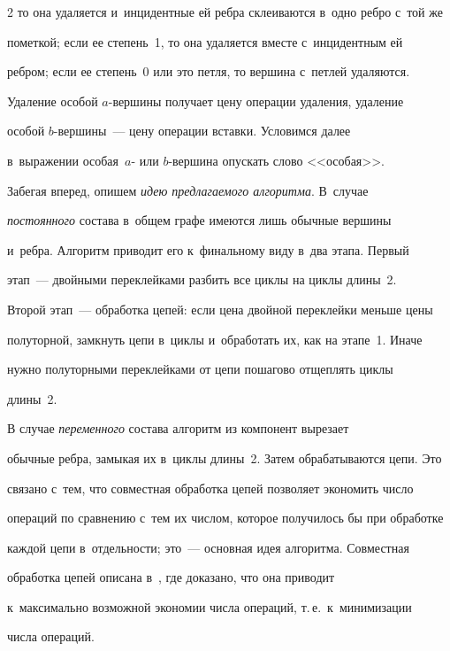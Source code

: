 \begin{multicols}{2}
то она удаляется и~инцидентные ей реб\-ра склеиваются в~одно реб\-ро с~той же 


пометкой; если ее степень~1, то она удаляется вместе с~инцидентным ей 


ребром; если ее степень~0 или это пет\-ля, то вершина с~пет\-лей удаляются. 


Удаление особой $a$-вер\-ши\-ны получает цену операции удаления, удаление 


особой $b$-вер\-ши\-ны~--- цену операции встав\-ки. Условимся далее 


в~выражении особая~$a$- или $b$-вер\-ши\-на опускать слово <<особая>>.


  


  Забегая вперед, опишем \textit{идею предлагаемого алгоритма}. В~случае 


\textit{постоянного} состава в~общем графе имеются лишь обычные вершины 


и~реб\-ра. Алгоритм приводит его к~финальному виду в~два этапа. Первый 


  этап~--- двойными переклейками разбить все циклы на циклы длины~2. 


Второй этап~--- обработка цепей: если цена двойной переклейки меньше цены 


полуторной, замкнуть цепи в~циклы и~обработать их, как на этапе~1. Иначе 


нужно полуторными переклейками от цепи пошагово отщеплять циклы 


длины~2.


  


  В случае \textit{переменного} состава алгоритм из компонент вырезает 


обычные реб\-ра, замыкая их в~циклы длины~2. Затем обрабатываются цепи. Это 


связано с~тем, что совместная обработка цепей позволяет экономить число 


операций по сравнению с~тем их числом, которое получилось бы при обработке 


каждой цепи в~отдельности; это~--- основная идея алгоритма. Совместная 


обработка цепей описана в~\cite{2-gor}, где доказано, что она приводит 


к~максимально возможной экономии числа операций, т.\,е.\ к~минимизации 


числа операций. 






\end{multicols}
